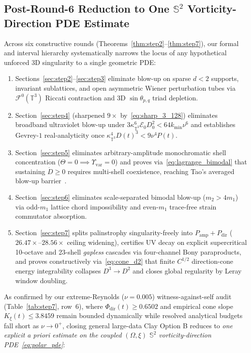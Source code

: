 \documentclass[11pt]{article}
\theoremstyle{plain}
\theoremstyle{definition}
\begin{document}
\subsection*{Post-Round-6 Reduction to One $\mathbb{S}^2$ Vorticity-Direction PDE Estimate}
Across six constructive rounds (Theorems~\ref{thm:step2}--\ref{thm:step7}), our formal and interval hierarchy systematically narrows the locus of any hypothetical unforced 3D singularity to a single geometric PDE:
\begin{enumerate}
  \item Sections~\ref{sec:step2}--\ref{sec:step3} eliminate blow-up on sparse $d < 2$ supports, invariant sublattices, and open asymmetric Wiener perturbation tubes via $\mathcal{F}^0(\mathbb{T}^3)$ Riccati contraction and 3D $\sin\theta_{p,q}$ triad depletion.
  \item Section~\ref{sec:step4} (sharpened $9\times$ by~\eqref{eq:sharp_3_128}) eliminates broadband ultraviolet blow-up under $3\kappa_{\mathbb{T}^3}^6 \mathcal{E}_0 D_0^2 < 64 k_{\min}\nu^6$ and establishes Gevrey-$1$ real-analyticity once $\kappa_{\mathbb{T}^3}^4 D(t)^3 < 9\nu^4 P(t)$.
  \item Section~\ref{sec:step5} eliminates arbitrary-amplitude monochromatic shell concentration ($\Theta = 0 \implies \Upsilon_{\mathrm{var}} = 0$) and proves via~\eqref{eq:lagrange_bimodal} that sustaining $\dot{D} \ge 0$ requires multi-shell coexistence, reaching Tao's averaged blow-up barrier~\cite{tao2016}.
  \item Section~\ref{sec:step6} eliminates scale-separated bimodal blow-up ($m_2 > 4 m_1$) via odd-$m_1$ lattice chord impossibility and even-$m_1$ trace-free strain commutator absorption.
  \item Section~\ref{sec:step7} splits palinstrophy singularity-freely into $P_{\mathrm{amp}} + P_{\mathrm{dir}}$ ($26.47\times$--$28.56\times$ ceiling widening), certifies UV decay on explicit supercritical 10-octave and 23-shell \emph{gapless} cascades via four-channel Bony paraproducts, and proves constructively via~\eqref{eq:cone_d2} that finite $C^{1/2}$ direction-cone energy integrability collapses $D^3 \to D^2$ and closes global regularity by Leray window doubling.
\end{enumerate}
As confirmed by our extreme-Reynolds ($\nu = 0.005$) witness-against-self audit (Table~\ref{tab:step7}, row~6), where $\Phi_{\mathrm{dir}}(t) \ge 0.6502$ and empirical cone slope $K_\xi(t) \le 3.8459$ remain bounded dynamically while resolved analytical budgets fall short as $\nu \to 0^+$, closing general large-data Clay Option B reduces to \emph{one explicit a priori estimate on the coupled $(\Omega,\xi)$ $\mathbb{S}^2$ vorticity-direction PDE~\eqref{eq:polar_pde}}:
\end{document}
